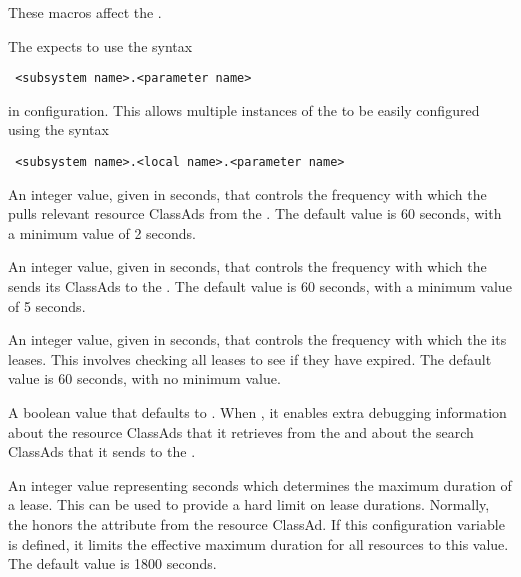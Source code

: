 These macros affect the .

The  expects to use the syntax
\begin{verbatim}
 <subsystem name>.<parameter name>
\end{verbatim}
in configuration.
This allows multiple instances of the
 to be easily configured using the syntax
\begin{verbatim}
 <subsystem name>.<local name>.<parameter name>
\end{verbatim}

\begin{description}

\label{param:LeaseManager.GetAdsInterval}
\item[\Macro{LeaseManager.GETADS\_INTERVAL}]
  An integer value, given in seconds, that controls the frequency
  with which the 
  pulls relevant resource ClassAds from the .
  The default value is 60 seconds, with a minimum value of 2 seconds.


\label{param:LeaseManager.UpdateInterval}
\item[\Macro{LeaseManager.UPDATE\_INTERVAL}]
  An integer value, given in seconds, that controls the frequency
  with which the 
  sends its ClassAds to the .
  The default value is 60 seconds, with a minimum value of 5 seconds.

\label{param:LeaseManager.PruneInterval}
\item[\Macro{LeaseManager.PRUNE\_INTERVAL}]
  An integer value, given in seconds, that controls the frequency
  with which the   its leases.
  This involves checking all leases to see if they have expired.
  The default value is 60 seconds, with no minimum value.

\label{param:LeaseManager.DebugAds}
\item[\Macro{LeaseManager.DEBUG\_ADS}]
  A boolean value that defaults to .
  When , it enables extra
  debugging information about the resource ClassAds that it retrieves
  from the  and about the search ClassAds that it sends
  to the .

\label{param:LeaseManager.MaxLeaseDuration}
\item[\Macro{LeaseManager.MAX\_LEASE\_DURATION}]
  An integer value representing seconds which determines 
  the maximum duration of a lease.  This can
  be used to provide a hard limit on lease durations.  Normally, the
   honors the  attribute
  from the resource ClassAd.  If this configuration variable is defined,
  it limits the effective maximum duration for all resources to this value.
  The default value is 1800 seconds.


\end{description}
